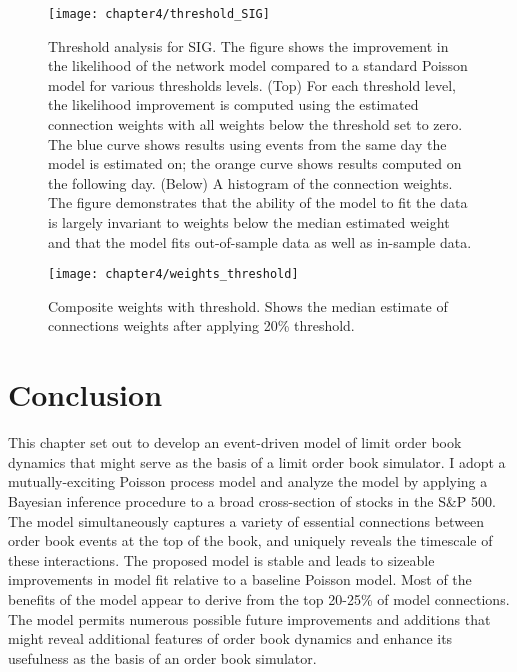 			\begin{figure}[p]
				\small
				\linespread{1}
				\centering
				\captionsetup{labelsep=colon, font=footnotesize, justification=centerfirst, width=\linewidth}
				\texttt{[image: chapter4/threshold\_SIG]}
				\captionsetup{skip=-20pt, position=below, font=footnotesize, justification=justified, width=\linewidth}
				\caption[Threshold analysis for SIG]{Threshold analysis for SIG. The figure shows the improvement in the likelihood of the network model compared to a standard Poisson model for various thresholds levels. (Top) For each threshold level, the likelihood improvement is computed using the estimated connection weights with all weights below the threshold set to zero. The blue curve shows results using events from the same day the model is estimated on; the orange curve shows results computed on the following day. (Below) A histogram of the connection weights. The figure demonstrates that the ability of the model to fit the data is largely invariant to weights below the median estimated weight and that the model fits out-of-sample data as well as in-sample data.}
				\label{fig:threshold_SIG}
			\end{figure}

			\begin{figure}[p]
				\small
				\linespread{1}
				\centering
				\texttt{[image: chapter4/weights\_threshold]}
				\captionsetup{skip=-20pt, position=below, font=footnotesize, justification=justified, width=\linewidth}
				\caption[Composite weights with threshold]{Composite weights with threshold. Shows the median estimate of connections weights after applying 20\% threshold.}
				\label{fig:weights_threshold}
			\end{figure}


\section{Conclusion}
	This chapter set out to develop an event-driven model of limit order book dynamics that might serve as the basis of a limit order book simulator. I adopt a mutually-exciting Poisson process model and analyze the model by applying a Bayesian inference procedure to a broad cross-section of stocks in the S\&P 500. The model simultaneously captures a variety of essential connections between order book events at the top of the book, and uniquely reveals the timescale of these interactions. The proposed model is stable and leads to sizeable improvements in model fit relative to a baseline Poisson model. Most of the benefits of the model appear to derive from the top 20-25\% of model connections. The model permits numerous possible future improvements and additions that might reveal additional features of order book dynamics and enhance its usefulness as the basis of an order book simulator.
